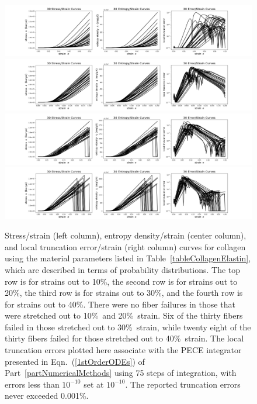 \begin{figure}
    \mbox{}\hspace{-1.5cm}
    \includegraphics[width=1.2\textwidth]{figures/bioFibers10.jpg}
    \mbox{}\hspace{-1.5cm}
    \includegraphics[width=1.2\textwidth]{figures/bioFibers20.jpg}
    \mbox{}\hspace{-1.5cm}
    \includegraphics[width=1.2\textwidth]{figures/bioFibers30.jpg}
    \mbox{}\hspace{-1.5cm}
    \includegraphics[width=1.2\textwidth]{figures/bioFibers40.jpg}
    \caption{Stress\slash strain (left column), entropy density\slash strain (center column), and local truncation error\slash strain (right column) curves for collagen using the material parameters listed in Table~\ref{tableCollagenElastin}, which are described in terms of probability distributions.  The top row is for strains out to 10\%, the second row is for strains out to 20\%, the third row is for strains out to 30\%, and the fourth row is for strains out to 40\%.  There were no fiber failures in those that were stretched out to 10\%\ and 20\%\ strain.  Six of the thirty fibers failed in those stretched out to 30\%\ strain, while twenty eight of the thirty fibers failed for those stretched out to 40\%\ strain.  The local truncation errors plotted here associate with the PECE integrator presented in Eqn.~(\ref{1stOrderODEs}) of Part~\ref{partNumericalMethods} using 75 steps of integration, with errors less than $10^{-10}$ set at $10^{-10}$.  The reported truncation errors never exceeded 0.001\%.}
    \label{figCollagenFiber}
\end{figure}

